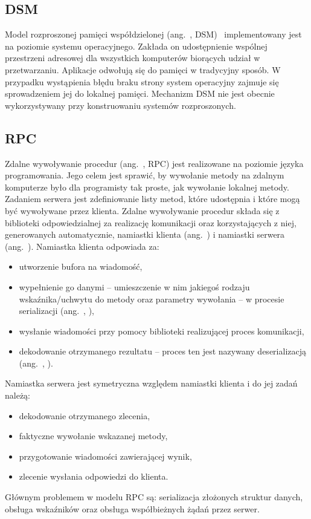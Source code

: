 \subsection{DSM}

\label{sub:background-DSM}Model rozproszonej pamięci współdzielonej
(ang.~, DSM)~\cite{DSM} implementowany
jest na poziomie systemu operacyjnego. Zakłada on udostępnienie wspólnej
przestrzeni adresowej dla wszystkich komputerów biorących udział w
przetwarzaniu. Aplikacje odwołują się do pamięci w tradycyjny sposób.
W przypadku wystąpienia błędu braku strony system operacyjny zajmuje
się sprowadzeniem jej do lokalnej pamięci. Mechanizm DSM nie jest
obecnie wykorzystywany przy konstruowaniu systemów rozproszonych.


\subsection{RPC}

\label{def:background-RPC}Zdalne wywoływanie procedur (ang.~,
RPC) \cite{RPC} jest realizowane na poziomie języka programowania.
Jego celem jest sprawić, by wywołanie metody na zdalnym komputerze
było dla programisty tak proste, jak wywołanie lokalnej metody. Zadaniem
serwera jest zdefiniowanie listy metod, które udostępnia i które mogą
być wywoływane przez klienta. Zdalne wywoływanie procedur składa się
z biblioteki odpowiedzialnej za realizację komunikacji oraz korzystających
z niej, generowanych automatycznie, namiastki klienta (ang.~)
i namiastki serwera (ang.~). Namiastka klienta
odpowiada za:
\begin{itemize}
\item utworzenie bufora na wiadomość, 
\item wypełnienie go danymi -- umieszczenie w nim jakiegoś rodzaju wskaźnika/uchwytu
do metody oraz parametry wywołania -- w procesie serializacji (ang.~,
), 
\item wysłanie wiadomości przy pomocy biblioteki realizującej proces komunikacji,
\item dekodowanie otrzymanego rezultatu -- proces ten jest nazywany deserializacją
(ang.~, ).
\end{itemize}
Namiastka serwera jest symetryczna względem namiastki klienta i do
jej zadań należą:
\begin{itemize}
\item dekodowanie otrzymanego zlecenia,
\item faktyczne wywołanie wskazanej metody,
\item przygotowanie wiadomości zawierającej wynik,
\item zlecenie wysłania odpowiedzi do klienta.
\end{itemize}
Głównym problemem w modelu RPC są: serializacja złożonych struktur
danych, obsługa wskaźników oraz obsługa współbieżnych żądań przez
serwer.


